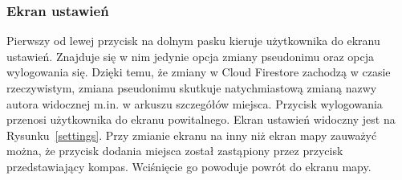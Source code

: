         \subsubsection{Ekran ustawień}
        Pierwszy od lewej przycisk na dolnym pasku kieruje użytkownika do ekranu ustawień. Znajduje się w nim jedynie opcja zmiany pseudonimu oraz opcja wylogowania się. Dzięki
        temu, że zmiany w Cloud Firestore zachodzą w czasie rzeczywistym, zmiana pseudonimu skutkuje natychmiastową zmianą nazwy autora widocznej m.in. w arkuszu szczegółów miejsca.
        Przycisk wylogowania przenosi użytkownika do ekranu powitalnego. Ekran ustawień widoczny jest na Rysunku~\ref{settings}. Przy zmianie ekranu na inny niż ekran mapy zauważyć można, że
        przycisk dodania miejsca został zastąpiony przez przycisk przedstawiający kompas. Wciśnięcie go powoduje powrót do ekranu mapy.

